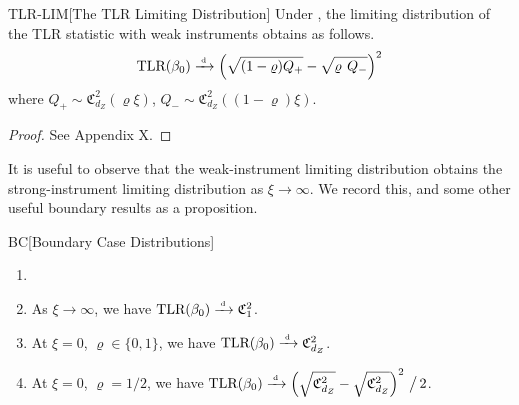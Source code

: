 \begin{propositionp}{TLR-LIM}[The TLR Limiting Distribution]
\label{prop:wi}
    Under , the limiting distribution of the TLR statistic with weak instruments obtains as follows.
    \begin{align}
    \textrm{TLR}(\beta_0) \xrightarrow{{\scriptscriptstyle \mathrm{\;d\;}}} 
    \left(\sqrt{(1-\varrho) Q_+}-\sqrt{\varrho\phantom{(} Q_-}\right)^2
\end{align}
where \(Q_+\sim \mathfrak{C}^2_{d_Z}(\varrho\xi)\), \(Q_-\sim \mathfrak{C}^2_{d_Z}((1-\varrho)\xi)\).
\end{propositionp}
\begin{proof}
    See Appendix X.
\end{proof}
\noindent 
It is useful to observe that the weak-instrument limiting distribution  obtains the strong-instrument limiting distribution as \(\xi\to \infty\). We record this, and some other useful boundary results as a proposition.
\begin{propositionp}{BC}[Boundary Case Distributions]
\label{prop:lim}
\begin{enumerate}
    \item[] 
    \item 
    As \(\xi\to \infty\), we have
    \(\textrm{TLR}(\beta_0) \xrightarrow{{\scriptscriptstyle \mathrm{\;d\;}}}
    \mathfrak{C}^2_1\).
    \item 
    At \(\xi= 0\), \(\varrho\in \{0,1\}\), we have
    \(\textrm{TLR}(\beta_0) \xrightarrow{{\scriptscriptstyle \mathrm{\;d\;}}}
     \mathfrak{C}^2_{d_Z}\).
    \item 
    At  \(\xi= 0\), \(\varrho=1/2\), we have
    \(\textrm{TLR}(\beta_0) \xrightarrow{{\scriptscriptstyle \mathrm{\;d\;}}}
    \left(\sqrt{\mathfrak{C}^2_{d_Z}} -\sqrt{\mathfrak{C}^2_{d_Z}}\right)^2 \,\big/\,2\).
    
    
\end{enumerate}
\end{propositionp}
